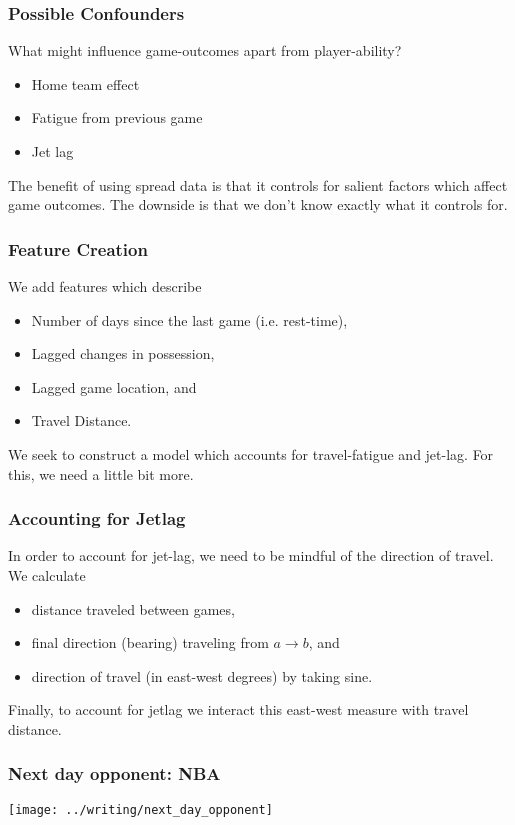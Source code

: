 \documentclass{beamer}
\begin{document}
\begin{frame}   
  \frametitle{Possible Confounders}
  What might influence game-outcomes apart from player-ability?

  \begin{itemize}     
    \item Home team effect
    \item Fatigue from previous game
    \item Jet lag   
    \end{itemize}

  The benefit of using spread data is that it controls for salient factors which affect game outcomes.
  The downside is that we don't know exactly what it controls for. \end{frame}

\begin{frame}   \frametitle{Feature Creation}
  We add features which describe
  \begin{itemize}     
    \item Number of days since the last game (i.e. rest-time),
    \item Lagged changes in possession,
    \item Lagged game location, and
    \item Travel Distance.   
  \end{itemize}
  We seek to construct a model which accounts for travel-fatigue and jet-lag.
  For this, we need a little bit more. \end{frame}

\begin{frame}   \frametitle{Accounting for Jetlag}
  In order to account for jet-lag, we need to be mindful of the direction of travel. We calculate
  \begin{itemize}     \item distance traveled between games,
    \item final direction (bearing) traveling from $a \to b$, and
    \item direction of travel (in east-west degrees) by taking sine.
  \end{itemize}
  Finally, to account for jetlag we interact this east-west measure with travel distance. \end{frame}

\begin{frame}   \frametitle{Next day opponent: NBA}
  \centering \texttt{[image: ../writing/next\_day\_opponent]} \end{frame}
\end{document}
